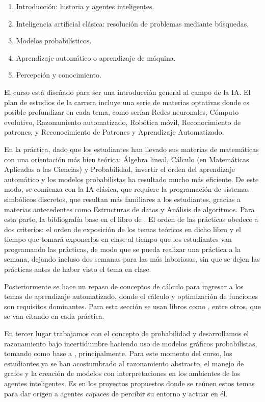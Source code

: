 \begin{enumerate}
 \item Introducción: historia y agentes inteligentes.
 \item Inteligencia artificial clásica: resolución de problemas mediante búsquedas.
 \item Modelos probabilísticos.
 \item Aprendizaje automático o aprendizaje de máquina.
 \item Percepción y conocimiento.
\end{enumerate}

El curso está diseñado para ser una introducción general al campo de la IA.  El plan de estudios de la carrera incluye una serie de materias optativas donde es posible profundizar en cada tema, como serían Redes neuronales, Cómputo evolutivo, Razonamiento automatizado, Robótica móvil, Reconocimiento de patrones, y Reconocimiento de Patrones y Aprendizaje Automatizado.

En la práctica, dado que los estudiantes han llevado sus materias de matemáticas con una orientación más bien teórica: Álgebra lineal, Cálculo (en Matemáticas Aplicadas a las Ciencias) y Probabilidad, invertir el orden del aprendizaje automático y los modelos probabilistas ha resultado mucho más eficiente.  De este modo, se comienza con la IA clásica, que requiere la programación de sistemas simbólicos discretos, que resultan más familiares a los estudiantes, gracias a materias antecedentes como Estructuras de datos y Análisis de algoritmos.  Para esta parte, la bibliografía base en el libro de \cite{Russell2010}.  El orden de las prácticas obedece a dos criterios: el orden de exposición de los temas teóricos en dicho libro y el tiempo que tomará exponerlos en clase al tiempo que los estudiantes van programando las prácticas, de modo que se pueda realizar una práctica a la semana, dejando incluso dos semanas para las más laboriosas, sin que se dejen las prácticas antes de haber visto el tema en clase.

Posteriormente se hace un repaso de conceptos de cálculo para ingresar a los temas de aprendizaje automatizado, donde el cálculo y optimización de funciones son requisitos dominantes.  Para esta sección se usan libros como \cite{Nengnevitsky2005, Mitchell1997}, entre otros, que se van citando en cada práctica.

En tercer lugar trabajamos con el concepto de probabilidad y desarrollamos el razonamiento bajo incertidumbre haciendo uso de modelos gráficos probabilistas, tomando como base a \cite{KollerFriedman2009}, principalmente.  Para este momento del curso, los estudiantes ya se han acostumbrado al razonamiento abstracto, el manejo de grafos y la creación de modelos con interpretaciones en los ambientes de los agentes inteligentes.  Es en los proyectos propuestos donde se reúnen estos temas para dar origen a agentes capaces de percibir su entorno y actuar en él.

